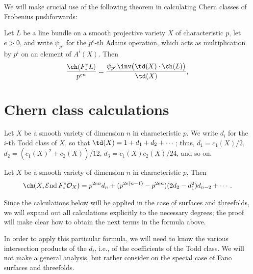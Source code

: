 \documentclass{article}
\def\O{\mathcal O}
\numberwithin{equation}{section}
\theoremstyle{theorem}
\numberwithin{thm}{section}
\theoremstyle{definition}
\DeclareMathOperator{\SEnd}{\mathcal{E}nd}
\begin{document}
We will make crucial use of the following theorem in calculating Chern classes of Frobenius pushforwards:

\begin{thm}{{\cite[Theorem~6.7]{wonderful}}}
\label{wonderfulthm}
Let $L$ be a line bundle on a smooth projective variety $X$ of characteristic $p$, let $e>0$, and write $\psi_{p^e}$ for the $p^e$-th Adams operation, which acts as multiplication by $p^i$ on an element of $A^i(X)$. Then
$$
\frac{\ch(F_*^e L)}{p^{e n}} 
= \frac{\psi_{p^e}\inv\bigl(\td(X) \cdot \ch(L)\bigr)}{\td(X)},
$$
\end{thm}


\section{Chern class calculations}
\label{cccalc}


Let $X$ be a smooth variety of dimension $n$ in characteristic $p$.
We write $d_i$ for the $i$-th Todd class of $X$, so that $\td(X)=1+d_1+d_2+\cdots$; thus, $d_1=c_1(X)/2$, $d_2=(c_1(X)^2+c_2(X))/12$, $d_3=c_1(X)c_2(X)/24$, and so on.

\begin{prop}
Let $X$ be a smooth variety of dimension $n$ in characteristic $p$.
Then 
$$\ch(X,\SEnd F_*^e\O_X) = 
\let\bigg\Big
p^{2en} d_n + 
(p^{2e(n-1)}-p^{2en})(2d_2-d_1^2 )d_{n-2}+\cdots
.$$
\end{prop}

\begin{rem}
Since the calculations below will be applied in the case of surfaces and threefolds, we will expand out all calculations explicitly to the necessary degrees; the proof will make clear how to obtain the next terms in the formula above.

In order to apply this particular formula, we will need to know the various intersection products of the $d_i$, i.e., of the coefficients of the Todd class. We will not make a general analysis, but rather consider on the special case of Fano surfaces and threefolds.
\end{rem}
\end{document}
